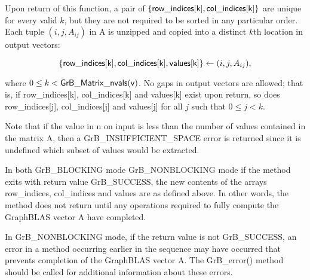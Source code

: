 Upon return of this function, a pair of $\{{\sf row\_indices[k], col\_indices[k]}\}$ are unique for every valid $k$, 
but they are not required to be sorted in any particular order.
Each tuple $(i,j,A_{ij})$ in {\sf A} is unzipped and copied into a distinct $k$th location in output vectors:  

$$\{{\sf row\_indices[k]}, {\sf col\_indices[k]}, {\sf values[k]}\} \leftarrow (i,j,A_{ij}),$$

where $0 \leq k < {\sf GrB\_Matrix\_nvals(v)}$. 
No gaps in output vectors are allowed; that is, if {\sf row\_indices[k]},  {\sf col\_indices[k]}  and {\sf values[k]} exist upon return, 
so does {\sf row\_indices[j]}, {\sf col\_indices[j]} and {\sf values[j]} for all $j$ such that $0 \leq j < k$.

Note that if the value in {\sf n} on input is less than the number of values
contained in the matrix {\sf A}, then a {\sf GrB\_INSUFFICIENT\_SPACE} error 
is returned since it is undefined which subset of values would
be extracted.

In both {\sf GrB\_BLOCKING} mode {\sf GrB\_NONBLOCKING} mode
if the method exits with return value {\sf GrB\_SUCCESS}, the  new 
contents of the arrays {\sf row\_indices}, {\sf col\_indices} and {\sf values} are as defined above.  In other words, the method
does not return until any operations required to fully compute 
the GraphBLAS vector {\sf A} have completed. 

In {\sf GrB\_NONBLOCKING} mode, if the return value is 
not {\sf GrB\_SUCCESS}, an error in a method occurring earlier in the sequence
may have occurred that prevents completion of the GraphBLAS vector {\sf A}.
The {\sf GrB\_error()} method should be called for additional information 
about these errors.


